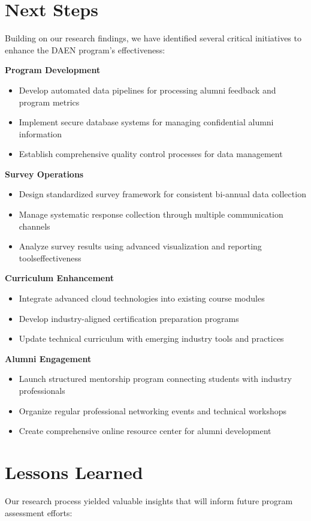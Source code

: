 \documentclass[12pt,a4paper]{article}
\begin{document}
\newpage

\section{Next Steps}
Building on our research findings, we have identified several critical initiatives to enhance the DAEN program's effectiveness:

\noindent\textbf{Program Development}
\begin{itemize}
\item Develop automated data pipelines for processing alumni feedback and program metrics
\item Implement secure database systems for managing confidential alumni information
\item Establish comprehensive quality control processes for data management
\end{itemize}
\textbf{Survey Operations}
\begin{itemize}
\item Design standardized survey framework for consistent bi-annual data collection
\item Manage systematic response collection through multiple communication channels
\item Analyze survey results using advanced visualization and reporting toolseffectiveness
\end{itemize}
\textbf{Curriculum Enhancement}
\begin{itemize}
\item Integrate advanced cloud technologies into existing course modules
\item Develop industry-aligned certification preparation programs
\item Update technical curriculum with emerging industry tools and practices
\end{itemize}
\textbf{Alumni Engagement}
\begin{itemize}
\item Launch structured mentorship program connecting students with industry professionals
\item Organize regular professional networking events and technical workshops
\item Create comprehensive online resource center for alumni development
\end{itemize}

\newpage

\section{Lessons Learned}
Our research process yielded valuable insights that will inform future program assessment efforts:
\end{document}
